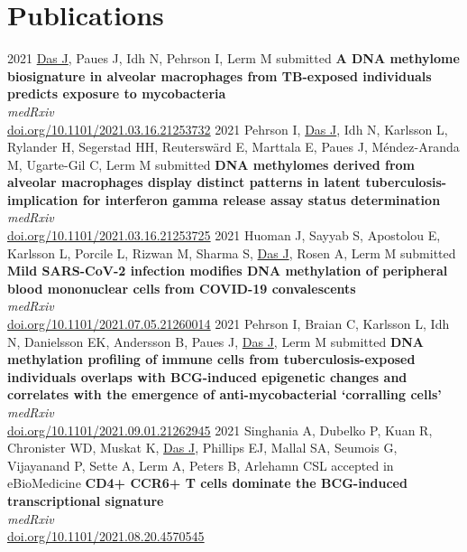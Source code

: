 \documentclass[]{friggeri-cv}
\begin{document}
\section{Publications}
\begin{entrylist}
\entry
	{2021}
	{\underline{Das J}, Paues J, Idh N, Pehrson I, Lerm M}
	{submitted}
	{\textbf{A DNA methylome biosignature in alveolar macrophages from TB-exposed individuals predicts exposure to mycobacteria}\\
	\emph{medRxiv}\\ \href{https://www.medrxiv.org/content/10.1101/2021.03.16.21253732v1.full.pdf}{doi.org/10.1101/2021.03.16.21253732}}
\entry
	{2021}
	{Pehrson I, \underline{Das J}, Idh N, Karlsson L, Rylander H, Segerstad HH, Reuterswärd E, Marttala E, Paues J, Méndez-Aranda M, Ugarte-Gil C, Lerm M}
	{submitted}
	{\textbf{DNA methylomes derived from alveolar macrophages display distinct patterns in latent tuberculosis-implication for interferon gamma release assay status determination}\\
	\emph{medRxiv}\\ \href{https://www.medrxiv.org/content/10.1101/2021.03.16.21253725v1.full.pdf}{doi.org/10.1101/2021.03.16.21253725}}
\entry
	{2021}
	{Huoman J, Sayyab S, Apostolou E, Karlsson L, Porcile L, Rizwan M, Sharma S, \underline{Das J}, Rosen A, Lerm M}
	{submitted}
	{\textbf{Mild SARS-CoV-2 infection modifies DNA methylation of peripheral blood mononuclear cells from COVID-19 convalescents}\\
	\emph{medRxiv}\\ \href{https://www.medrxiv.org/content/10.1101/2021.07.05.21260014v1.full.pdf}{doi.org/10.1101/2021.07.05.21260014}}
\entry
	{2021}
	{Pehrson I, Braian C, Karlsson L, Idh N, Danielsson EK, Andersson B, Paues J, \underline{Das J}, Lerm M}
	{submitted}
	{\textbf{DNA methylation profiling of immune cells from tuberculosis-exposed individuals overlaps with BCG-induced epigenetic changes and correlates with the emergence of anti-mycobacterial ‘corralling cells’}\\
	\emph{medRxiv}\\ \href{https://www.medrxiv.org/content/10.1101/2021.09.01.21262945v1.full.pdf}{doi.org/10.1101/2021.09.01.21262945}}
\entry
	{2021}
	{Singhania A, Dubelko P, Kuan R, Chronister WD, Muskat K, \underline{Das J}, Phillips EJ, Mallal SA, Seumois G, Vijayanand P, Sette A, Lerm A, Peters B, Arlehamn CSL}
	{accepted in eBioMedicine}
	{\textbf{CD4+ CCR6+ T cells dominate the BCG-induced transcriptional signature}\\
	\emph{medRxiv}\\ \href{https://www.biorxiv.org/content/10.1101/2021.08.20.457054v1.full.pdf}{doi.org/10.1101/2021.08.20.4570545}}
\end{entrylist}
\end{document}
